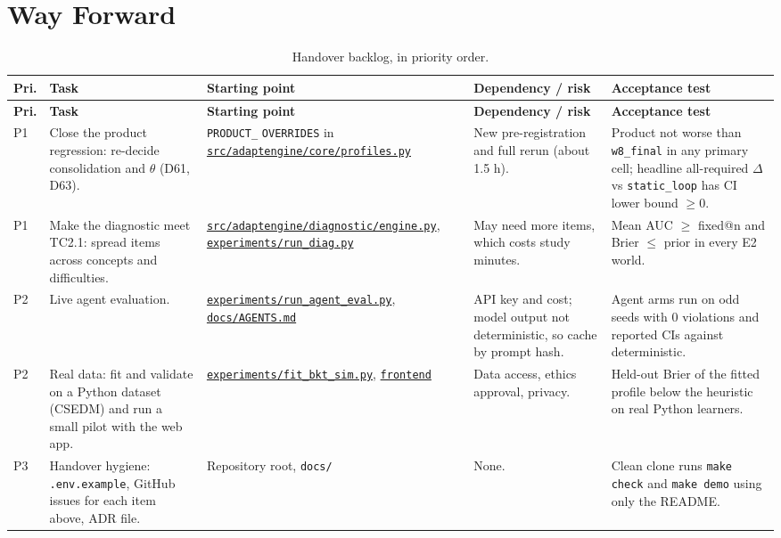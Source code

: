 \documentclass[11pt,a4paper]{article}
\newcommand{\finaltag}{cs5903-final-2026}
\newcommand{\repobase}{https://github.com/vhemanth06/AdaptEngine}
\newcommand{\repo}[1]{\href{\repobase/blob/\finaltag/#1}{\nolinkurl{#1}}}
\newcommand{\repodir}[1]{\href{\repobase/tree/\finaltag/#1}{\nolinkurl{#1}}}
\begin{document}
\section{Way Forward}

\begin{xltabular}{\textwidth}{
    @{}
    >{\raggedright\arraybackslash}p{0.06\textwidth}
    >{\raggedright\arraybackslash}p{0.2\textwidth}
    >{\raggedright\arraybackslash}p{0.2\textwidth}
    >{\raggedright\arraybackslash}p{0.18\textwidth}
    >{\raggedright\arraybackslash}X
    @{}
}
\caption{Handover backlog, in priority order.}
\label{tab:backlog}\\
\toprule
\textbf{Pri.} & \textbf{Task} & \textbf{Starting point} & \textbf{Dependency / risk} & \textbf{Acceptance test} \\
\midrule
\endfirsthead
\toprule
\textbf{Pri.} & \textbf{Task} & \textbf{Starting point} & \textbf{Dependency / risk} & \textbf{Acceptance test} \\
\midrule
\endhead
\bottomrule
\endfoot
P1 & Close the product regression: re-decide consolidation and $\theta$ (D61, D63). & \texttt{PRODUCT\_} \texttt{OVERRIDES} in \repo{src/adaptengine/core/profiles.py} & New pre-registration and full rerun (about 1.5 h). & Product not worse than \texttt{w8\_final} in any primary cell; headline all-required $\Delta$ vs \texttt{static\_loop} has CI lower bound $\ge0$. \\
P1 & Make the diagnostic meet TC2.1: spread items across concepts and difficulties. & \repo{src/adaptengine/diagnostic/engine.py}, \repo{experiments/run_diag.py} & May need more items, which costs study minutes. & Mean AUC $\ge$ fixed@n and Brier $\le$ prior in every E2 world. \\
P2 & Live agent evaluation. & \repo{experiments/run_agent_eval.py}, \repo{docs/AGENTS.md} & API key and cost; model output not deterministic, so cache by prompt hash. & Agent arms run on odd seeds with 0 violations and reported CIs against deterministic. \\
P2 & Real data: fit and validate on a Python dataset (CSEDM) and run a small pilot with the web app. & \repo{experiments/fit_bkt_sim.py}, \repodir{frontend} & Data access, ethics approval, privacy. & Held-out Brier of the fitted profile below the heuristic on real Python learners. \\
P3 & Handover hygiene: \texttt{.env.example}, GitHub issues for each item above, ADR file. & Repository root, \texttt{docs/} & None. & Clean clone runs \texttt{make check} and \texttt{make demo} using only the README. \\
\end{xltabular}
\end{document}
